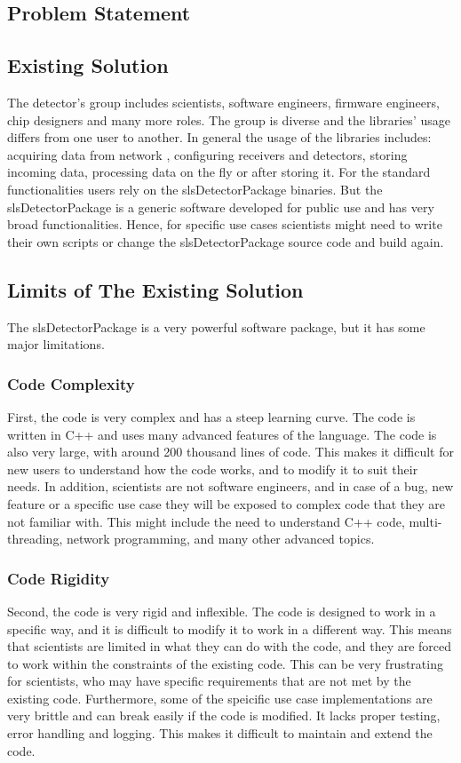 \begin{spacing}{1.2}
    \section{Problem Statement}
    \subsection{Existing Solution}
    The detector's group includes scientists, software engineers, firmware engineers, chip designers and many more roles.
    The group is diverse and the libraries' usage differs from one user to another. In general the usage of the libraries includes: acquiring data from network
    , configuring receivers and detectors, storing incoming data, processing data on the fly or after storing it.
    For the standard functionalities users rely on the slsDetectorPackage binaries. But the slsDetectorPackage is a generic software
    developed for public use and has very broad functionalities. Hence, for specific use cases scientists might need to write their own scripts
    or change the slsDetectorPackage source code and build again.
    \subsection{Limits of The Existing Solution}
    The slsDetectorPackage is a very powerful software package, but it has some major limitations.
    \subsubsection{Code Complexity}
    First, the code is very complex and has a steep learning curve. The code is written in C++ and uses
    many advanced features of the language. The code is also very large, with around 200 thousand lines of code.
    This makes it difficult for new users to understand how the code works, and to modify it to suit their needs.
    In addition, scientists are not software engineers, and in case of a bug, new feature or a specific use case
    they will be exposed to complex code that they are not familiar with. This might include the need to understand
    C++ code, multi-threading, network programming, and many other advanced topics.


    \subsubsection{Code Rigidity}
    Second, the code is very rigid and inflexible. The code is designed to work in a specific way, and it is difficult
    to modify it to work in a different way. This means that scientists are limited in what they can do with the code,
    and they are forced to work within the constraints of the existing code. This can be very frustrating for scientists,
    who may have specific requirements that are not met by the existing code.
    Furthermore, some of the speicific use case implementations are very brittle and can break easily if the code is modified.
    It lacks proper testing, error handling and logging. This makes it difficult to maintain and extend the code.



\end{spacing}
